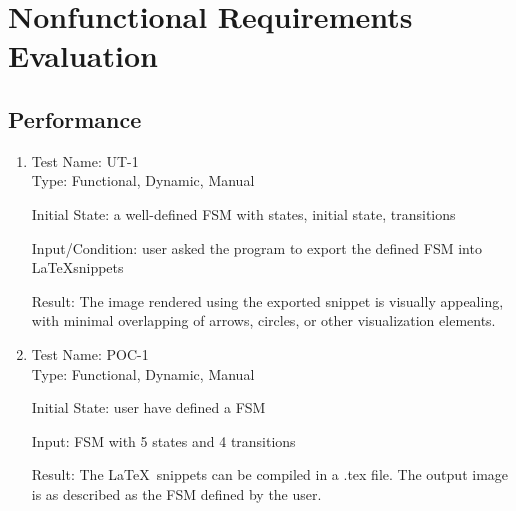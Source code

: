 \documentclass[12pt, titlepage]{article}
\begin{document}
\section{Nonfunctional Requirements Evaluation}

\subsection{Performance}
    \begin{enumerate}
        \item Test Name: UT-1 \\
        
            Type: Functional, Dynamic, Manual
  
            Initial State: a well-defined FSM with states, initial state, transitions
  
            Input/Condition: user asked the program to export the defined FSM into \LaTeX snippets

            Result: The image rendered using the exported snippet is visually appealing, with minimal overlapping of arrows, circles, or other visualization elements.
        
        \item Test Name: POC-1\\
        
            Type: Functional, Dynamic, Manual
					
            Initial State: user have defined a FSM
					
            Input: FSM with 5 states and 4 transitions

            Result: The \LaTeX\ snippets can be compiled in a .tex file. The output image is as described as the FSM defined by the user.
    \end{enumerate}     
          
\end{document}
